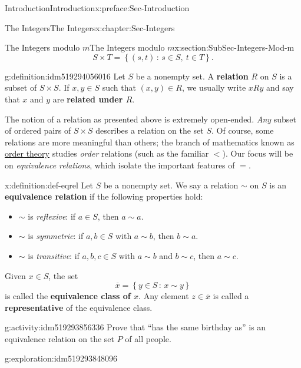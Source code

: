 \documentclass[oneside,10pt,]{book}
\newcommand{\terminology}[1]{\textbf{#1}}
\numberwithin{equation}{section}
\newcommand{\setof}[2]{{\left\{#1\,\colon\,#2\right\}}}
\newcommand{\lt}{<}
\begin{document}
\begin{preface}{Introduction}{}{Introduction}{}{}{x:preface:Sec-Introduction}
\begin{chapterptx}{The Integers}{}{The Integers}{}{}{x:chapter:Sec-Integers}
\begin{sectionptx}{The Integers modulo \(m\)}{}{The Integers modulo \(m\)}{}{}{x:section:SubSec-Integers-Mod-m}
\begin{equation*}
S\times T = \setof{(s,t)}{s\in S, \ t\in T}.
\end{equation*}
\begin{definition}{}{g:definition:idm519294056016}%
%
Let \(S\) be a nonempty set. A \terminology{relation} \(R\) on \(S\) is a subset of \(S\times S\). If \(x,y\in S\) such that \((x,y)\in R\), we usually write \(xRy\) and say that \(x\) and \(y\) are \terminology{related under \(R\)}.%
\end{definition}
The notion of a relation as presented above is extremely open-ended. \emph{Any} subset of ordered pairs of \(S\times S\) describes a relation on the set \(S\). Of course, some relations are more meaningful than others; the branch of mathematics known as \href{https://en.wikipedia.org/wiki/Order_theory}{order theory} studies \emph{order} relations (such as the familiar \(\lt\)). Our focus will be on \emph{equivalence relations}, which isolate the important features of \(=\).%
\begin{definition}{}{x:definition:def-eqrel}%
%
%
%
Let \(S\) be a nonempty set. We say a relation \(\sim\) on \(S\) is an \terminology{equivalence relation} if the following properties hold:%
\begin{itemize}[label=\textbullet]
\item{}\(\sim\) is \emph{reflexive}: if \(a\in S\), then \(a\sim a\).%
\item{}\(\sim\) is \emph{symmetric}: if \(a,b\in S\) with \(a\sim b\), then \(b\sim a\).%
\item{}\(\sim\) is \emph{transitive}: if \(a,b,c\in S\) with \(a\sim b\) and \(b\sim c\), then \(a\sim c\).%
\end{itemize}
%
\par
Given \(x\in S\), the set%
\begin{equation*}
\overline{x} = \setof{y\in S}{x\sim y}
\end{equation*}
is called the \terminology{equivalence class of \(x\)}. Any element \(z\in \overline{x}\) is called a \terminology{representative} of the equivalence class.%
\end{definition}
\begin{activity}{}{g:activity:idm519293856336}%
Prove that ``has the same birthday as'' is an equivalence relation on the set \(P\) of all people.%
\end{activity}
\begin{exploration}{}{g:exploration:idm519293848096}%

\end{exploration}
\end{sectionptx}
\end{chapterptx}
\end{preface}
\end{document}
